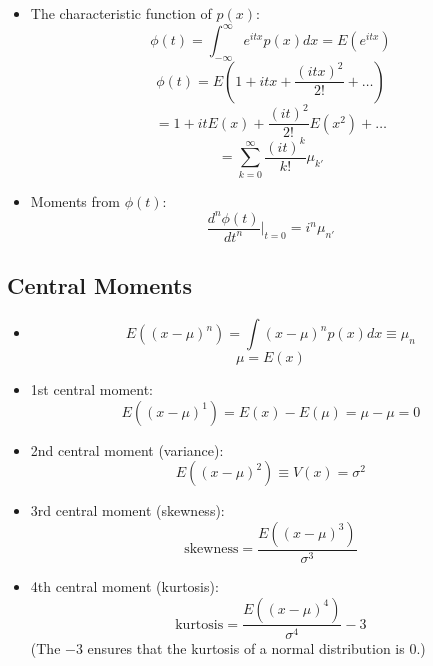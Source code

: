 \begin{itemize}
      \item The characteristic function of $p(x)$:
            \[ \phi(t) = \int_{-\infty}^{\infty} e^{itx} p(x) dx = E(e^{itx}) \]
            \[ \phi(t) = E \left( 1 + itx + \frac{(itx)^2}{2!} + \dots \right) \]
            \[ = 1 + it E(x) + \frac{(it)^2}{2!} E(x^2) + \dots \]
            \[ = \sum_{k=0}^{\infty} \frac{(it)^k}{k!} \mu_{k'} \]

      \item Moments from $\phi(t)$:
            \[ \frac{d^n \phi(t)}{dt^n} \Big|_{t=0} = i^n \mu_{n'} \]
\end{itemize}

\subsection{Central Moments}

\begin{itemize}
      \item
            \[ E((x-\mu)^n) = \int (x-\mu)^n p(x) dx \equiv \mu_n \]
            \[ \mu = E(x) \]

      \item 1st central moment:
            \[ E((x-\mu)^1) = E(x) - E(\mu) = \mu - \mu = 0 \]

      \item 2nd central moment (variance):
            \[ E((x-\mu)^2) \equiv V(x) = \sigma^2 \]

      \item 3rd central moment (skewness):
            \[ \text{skewness} = \frac{E((x-\mu)^3)}{\sigma^3} \]

      \item 4th central moment (kurtosis):
            \[ \text{kurtosis} = \frac{E((x-\mu)^4)}{\sigma^4} - 3 \]
            (The $-3$ ensures that the kurtosis of a normal distribution is 0.)
\end{itemize}

